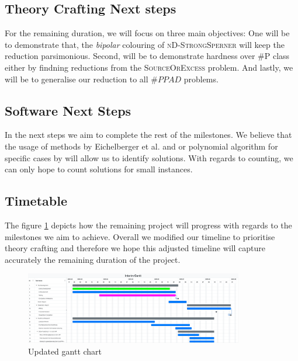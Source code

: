 \subsection{Theory Crafting Next steps}

For the remaining duration, we will focus on three main objectives:
One will be to demonstrate that, the \textit{bipolar} colouring
of \textsc{nD-StrongSperner} will keep the reduction parsimonious.
Second, will be to demonstrate hardness over \textsc{\#P} class either by findning
reductions from the \textsc{SourceOrExcess} problem.
And lastly, we will be to generalise our reduction to all $\#PPAD$ problems.


\subsection{Software Next Steps}

In the next steps we aim to complete the rest of the milestones. 
We believe that the usage of methods by Eichelberger et al. \cite{eichelberger_HazardDetectionCombinational_1965}
and or polynomial algorithm for specific cases by \cite{deligkas_PureCircuitTightInapproximability_2024}
will allow us to identify solutions. With regards to counting, we can only hope
to count solutions for small instances.


\subsection{Timetable}

The figure \ref{fig:gantt-new} depicts how the remaining project will progress with regards
to the milestones we aim to achieve. Overall we modified our timeline to prioritise
theory crafting and therefore we hope this adjusted timeline will capture accurately the remaining duration
of the project.

\begin{figure}[h!]
    \centering
    \includegraphics[width=0.85\textwidth]{assets/Interim Gantt 20250708.pdf}
    \caption{Updated gantt chart}\label{fig:gantt-new}
\end{figure}

